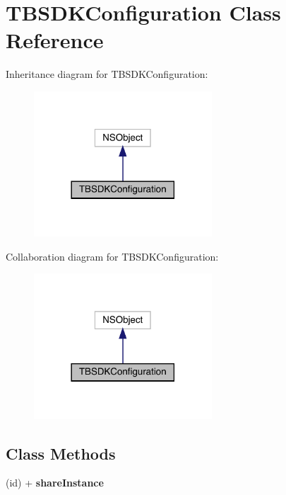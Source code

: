 \hypertarget{interface_t_b_s_d_k_configuration}{}\section{T\+B\+S\+D\+K\+Configuration Class Reference}
\label{interface_t_b_s_d_k_configuration}


Inheritance diagram for T\+B\+S\+D\+K\+Configuration\+:\nopagebreak
\begin{figure}[H]
\begin{center}
\leavevmode
\includegraphics[width=189pt]{interface_t_b_s_d_k_configuration__inherit__graph}
\end{center}
\end{figure}


Collaboration diagram for T\+B\+S\+D\+K\+Configuration\+:\nopagebreak
\begin{figure}[H]
\begin{center}
\leavevmode
\includegraphics[width=189pt]{interface_t_b_s_d_k_configuration__coll__graph}
\end{center}
\end{figure}
\subsection*{Class Methods}
\begin{DoxyCompactItemize}
\item 
\mbox{\label{interface_t_b_s_d_k_configuration_a4b9a09c6d2e3654067523d2f3010a798}} 
(id) + {\bfseries share\+Instance}
\end{DoxyCompactItemize}
